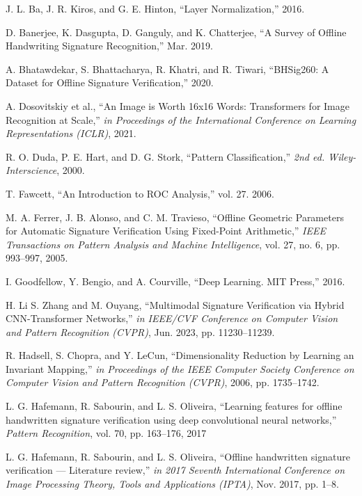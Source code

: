




\begin{thebibliography}{10}

J. L. Ba, J. R. Kiros, and G. E. Hinton, ``Layer Normalization,''
2016.

D. Banerjee, K. Dasgupta, D. Ganguly, and K. Chatterjee, ``A Survey of Offline Handwriting Signature Recognition,''
Mar. 2019.

A. Bhatawdekar, S. Bhattacharya, R. Khatri, and R. Tiwari, ``BHSig260: A Dataset for Offline Signature Verification,''
2020.

A. Dosovitskiy et al., ``An Image is Worth 16x16 Words: Transformers for Image Recognition at Scale,'' {\em in Proceedings of the International Conference on Learning Representations (ICLR)},
2021.

R. O. Duda, P. E. Hart, and D. G. Stork, ``Pattern Classification,'' {\em 2nd ed. Wiley-Interscience},
2000.

T. Fawcett, ``An Introduction to ROC Analysis,'' vol. 27.
2006.

M. A. Ferrer, J. B. Alonso, and C. M. Travieso, ``Offline Geometric Parameters for Automatic Signature Verification Using Fixed-Point Arithmetic,'' {\em IEEE Transactions on Pattern Analysis and Machine Intelligence}, vol. 27, no. 6, pp. 993--997,
2005.

I. Goodfellow, Y. Bengio, and A. Courville, ``Deep Learning. MIT Press,''
2016.

H. Li S. Zhang and M. Ouyang, ``Multimodal Signature Verification via Hybrid CNN-Transformer Networks,'' {\em in IEEE/CVF Conference on Computer Vision and Pattern Recognition (CVPR)},
Jun. 2023, pp. 11230--11239.

R. Hadsell, S. Chopra, and Y. LeCun, ``Dimensionality Reduction by Learning an Invariant Mapping,'' {\em in Proceedings of the IEEE Computer Society Conference on Computer Vision and Pattern Recognition (CVPR)},
2006, pp. 1735--1742.

L. G. Hafemann, R. Sabourin, and L. S. Oliveira, ``Learning features for offline handwritten signature verification using deep convolutional neural networks,'' {\em Pattern Recognition}, vol. 70, pp. 163--176,
2017

L. G. Hafemann, R. Sabourin, and L. S. Oliveira, ``Offline handwritten signature verification — Literature review,'' {\em in 2017 Seventh International Conference on Image Processing Theory, Tools and Applications (IPTA)},
Nov. 2017, pp. 1--8.


\end{thebibliography}
